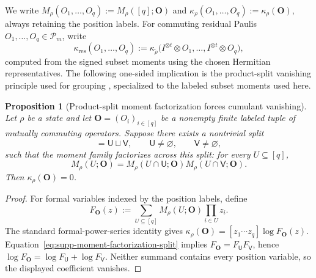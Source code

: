 \documentclass[
  aps,
  prx,
  reprint,
  superscriptaddress,
  amsmath,
  amssymb,
  nofootinbib,
  longbibliography
]{revtex4-2}
\newtheorem{proposition}[theorem]{Proposition}
\newcommand{\Pc}{\mathcal{P}}
\begin{document}
We write
$M_\rho(O_1,\dots,O_q):=M_\rho([q];\mathbf O)$ and
$\kappa_\rho(O_1,\dots,O_q):=\kappa_\rho(\mathbf O)$, always retaining the
position labels.  For commuting residual Paulis $O_1,\dots,O_q\in\Pc_m$,
write
\begin{equation}
\kappa_{\mathrm{res}}(O_1,\dots,O_q)
:=
\kappa_{\tilde\rho}
\bigl(
I^{\otimes t}\otimes O_1,\dots,
I^{\otimes t}\otimes O_q
\bigr),
\label{eq:supp-residual-cumulant-shorthand}
\end{equation}
computed from the signed subset moments using the chosen Hermitian
representatives.  The following one-sided implication is the
product-split vanishing principle used for grouping
\cite{doubilet1972foundations,smith2020multivariateKstatistics}, specialized
to the labeled subset moments used here.

\begin{proposition}[Product-split moment factorization forces cumulant vanishing]
\label{prop:supp-nonzero-cumulant-certifies-no-product-split}
Let $\rho$ be a state and let
$\mathbf O=(O_i)_{i\in[q]}$ be a nonempty finite labeled tuple of mutually
commuting operators.  Suppose there exists a nontrivial
split
\begin{equation}
[q]=\mathsf U\sqcup\mathsf V,
\qquad \mathsf U\neq\varnothing,
\qquad \mathsf V\neq\varnothing,
\end{equation}
such that the moment family factorizes across this split: for every
$U\subseteq[q]$,
\begin{equation}
M_\rho(U;\mathbf O)
=
M_\rho(U\cap\mathsf U;\mathbf O)
M_\rho(U\cap\mathsf V;\mathbf O).
\label{eq:supp-moment-factorization-split}
\end{equation}
Then
$\kappa_\rho(\mathbf O)=0$.
\end{proposition}

\begin{proof}
For formal variables indexed by the position labels, define
\begin{equation}
F_{\mathbf O}(z)
:=
\sum_{U\subseteq[q]}
M_\rho(U;\mathbf O)
\prod_{i\in U}z_i .
\end{equation}
The standard formal-power-series identity gives
$\kappa_\rho(\mathbf O)=[z_1\cdots z_q]\log F_{\mathbf O}(z)$.
Equation~\eqref{eq:supp-moment-factorization-split} implies
$F_{\mathbf O}=F_{\mathsf U}F_{\mathsf V}$, hence
$\log F_{\mathbf O}=\log F_{\mathsf U}+\log F_{\mathsf V}$.
Neither summand contains every position variable, so the displayed
coefficient vanishes.
\end{proof}
\end{document}
